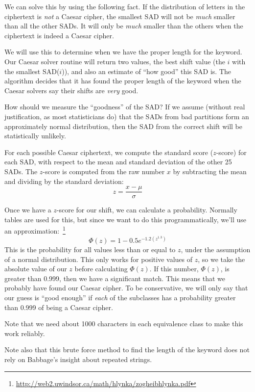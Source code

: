 \documentclass{article}
\begin{document}
\begin{description}
We can solve this by using the following fact.
If the distribution of letters in the ciphertext is {\em not} a Caesar
cipher, the smallest SAD will not be {\em much} smaller than all the
other SADs.  It will only be {\em much} smaller than the others when
the ciphertext is indeed a Caesar cipher.

We will use this to determine when we have the proper length for the
keyword.  Our Caesar solver routine will return two values, the best
shift value (the $i$ with the smallest SAD($i$)), and also an estimate
of ``how good'' this SAD is.  The algorithm decides that it has found
the proper length of the keyword when the Caesar solvers say their
shifts are {\em very} good.

How should we measure the ``goodness'' of the SAD?  If we assume
(without real justification, as most statisticians do) that the SADs
from bad partitions form an approximately normal distribution, then the
SAD from the correct shift will be statistically unlikely.

For each possible Caesar ciphertext, we
compute the standard score ($z$-score) for each SAD, with respect to
the mean and standard deviation of the other 25 SADs.  The $z$-score
is computed from the raw number $x$ by subtracting the mean and
dividing by the standard deviation:
\[
z = \frac{x - \mu}{\sigma}
\]


Once we have a $z$-score for our shift, we can calculate a
probability.  Normally tables are used for this, but since we want to
do this programmatically, we'll use an
approximation:\
\footnote{\url{http://web2.uwindsor.ca/math/hlynka/zogheibhlynka.pdf}}
  \[ \Phi(z) = 1 - 0.5 e^{-1.2(z^{1.3})} \]
This is the probability for all values less than or equal to $z$,
under the assumption of a normal distribution.
This only works for positive values of $z$, so we take the absolute
value of our $z$ before calculating $\Phi(z)$.
If this number, $\Phi(z)$, is greater than 0.999, then we have a
significant match.  This means that we probably have found our
Caesar cipher.  To be conservative, we will only say that our guess is
``good enough'' if {\em each} of the subclasses has a probability
greater than 0.999 of being a Caesar cipher.

Note that we need about 1000 characters in each equivalence class
to make this work reliably.

Note also that this brute force method to find the length of the keyword
does not rely on Babbage's insight about repeated strings.  
  


\end{description}
\end{document}
